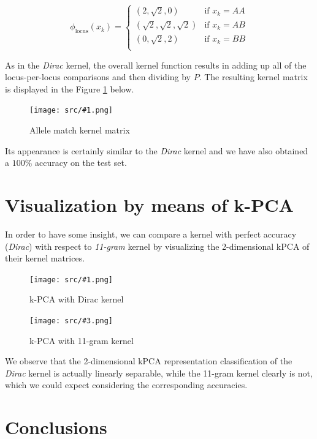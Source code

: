 \documentclass[a4paper, 11pt]{article}
\newcommand{\Figure}[3]{
	\begin{figure}[!h]
	\centering
	\texttt{[image: src/\#1.png]}
	\caption{#3}
	\label{fig:#1}
	\end{figure}
}
\newcommand{\Figures}[4]{
	\begin{figure}[!ht]
	\begin{minipage}[b]{.5\textwidth}
	\centering
	\texttt{[image: src/\#1.png]}
	\caption{#2}
	\label{fig:#1}
	\end{minipage}
	\hfill
	\begin{minipage}[b]{.5\textwidth}
	\centering
	\texttt{[image: src/\#3.png]}
	\caption{#4}
	\label{fig:#3}
	\end{minipage}
	\end{figure}
}
\theoremstyle{definition}
\theoremstyle{remark}
\begin{document}
\begin{equation*}
    \phi_{\text{locus}}(x_k) = \begin{cases}
        (2, \sqrt{2}, 0) & \text{if } x_k = AA \\
        (\sqrt{2}, \sqrt{2}, \sqrt{2}) & \text{if } x_k = AB \\
        (0, \sqrt{2}, 2) & \text{if } x_k = BB \\
    \end{cases}
\end{equation*}

As in the \textit{Dirac} kernel, the overall kernel function results in adding up all of the locus-per-locus comparisons and then dividing by $P$. The resulting kernel matrix is displayed in the Figure \ref{fig:allele_match_kernel} below.

\Figure{allele_match_kernel}{8.2}{Allele match kernel matrix}

Its appearance is certainly similar to the \textit{Dirac} kernel and we have also obtained a $100\%$ accuracy on the test set.




\newpage



\section{Visualization by means of k-PCA}

In order to have some insight, we can compare a kernel with perfect accuracy (\textit{Dirac}) with respect to \textit{11-gram} kernel by visualizing the 2-dimensional kPCA of their kernel matrices.


\Figures{dirac_kpca}{k-PCA with Dirac kernel}{11_gram_kpca}{k-PCA with 11-gram kernel}

We observe that the 2-dimensional kPCA representation classification of the \textit{Dirac} kernel is actually linearly separable, while the 11-gram kernel clearly is not, which we could expect considering the corresponding accuracies.




\section{Conclusions}
\end{document}
